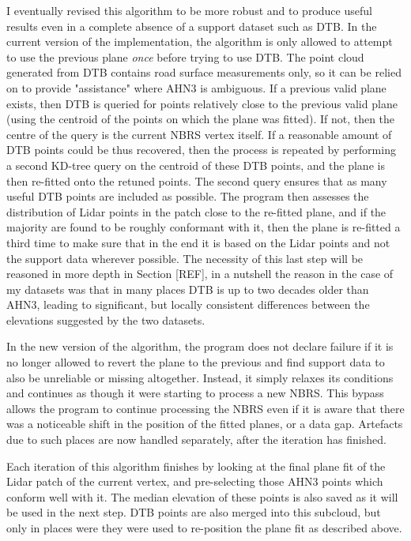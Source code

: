 I eventually revised this algorithm to be more robust and to produce useful results even in a complete absence of a support dataset such as DTB. In the current version of the implementation, the algorithm is only allowed to attempt to use the previous plane \textit{once} before trying to use DTB. The point cloud generated from DTB contains road surface measurements only, so it can be relied on to provide "assistance" where AHN3 is ambiguous. If a previous valid plane exists, then DTB is queried for points relatively close to the previous valid plane (using the centroid of the points on which the plane was fitted). If not, then the centre of the query is the current NBRS vertex itself. If a reasonable amount of DTB points could be thus recovered, then the process is repeated by performing a second KD-tree query on the centroid of these DTB points, and the plane is then re-fitted onto the retuned points. The second query ensures that as many useful DTB points are included as possible. The program then assesses the distribution of Lidar points in the patch close to the re-fitted plane, and if the majority are found to be roughly conformant with it, then the plane is re-fitted a third time to make sure that in the end it is based on the Lidar points and not the support data wherever possible. The necessity of this last step will be reasoned in more depth in Section [REF], in a nutshell the reason in the case of my datasets was that in many places DTB is up to two decades older than AHN3, leading to significant, but locally consistent differences between the elevations suggested by the two datasets.

In the new version of the algorithm, the program does not declare failure if it is no longer allowed to revert the plane to the previous and find support data to also be unreliable or missing altogether. Instead, it simply relaxes its conditions and continues as though it were starting to process a new NBRS. This bypass allows the program to continue processing the NBRS even if it is aware that there was a noticeable shift in the position of the fitted planes, or a data gap. Artefacts due to such places are now handled separately, after the iteration has finished.

Each iteration of this algorithm finishes by looking at the final plane fit of the Lidar patch of the current vertex, and pre-selecting those AHN3 points which conform well with it. The median elevation of these points is also saved as it will be used in the next step. DTB points are also merged into this subcloud, but only in places were they were used to re-position the plane fit as described above.

